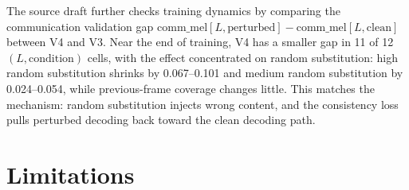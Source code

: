 \documentclass[10pt,twocolumn]{article}
\begin{document}
\begin{table}[t]
\centering
\caption{Paired marginal contribution tests for LCA components.}
\label{tab:ablation_tests}
\small
{}
\end{table}

The source draft further checks training dynamics by comparing the communication validation gap \( \mathrm{comm\_mel}[L,\mathrm{perturbed}]-\mathrm{comm\_mel}[L,\mathrm{clean}] \) between V4 and V3. Near the end of training, V4 has a smaller gap in 11 of 12 \((L,\mathrm{condition})\) cells, with the effect concentrated on random substitution: high random substitution shrinks by 0.067--0.101 and medium random substitution by 0.024--0.054, while previous-frame coverage changes little. This matches the mechanism: random substitution injects wrong content, and the consistency loss pulls perturbed decoding back toward the clean decoding path.

\section{Limitations}
\end{document}
